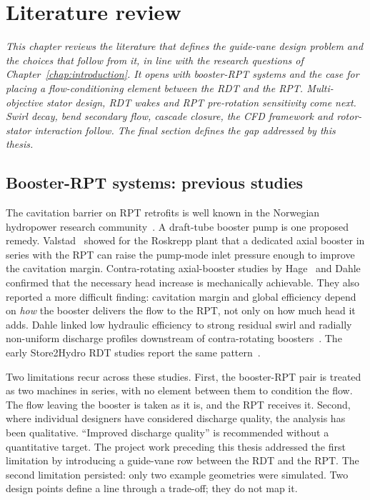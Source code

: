 \chapter{Literature review}
\label{chap:litterature}
 
\begin{center} %
\singlespacing\parbox{12cm}{\textit{
This chapter reviews the literature that defines the guide-vane design problem and the choices that follow from it, in line with the research questions of Chapter~\ref{chap:introduction}. It opens with booster-RPT systems and the case for placing a flow-conditioning element between the RDT and the RPT. Multi-objective stator design, RDT wakes and RPT pre-rotation sensitivity come next. Swirl decay, bend secondary flow, cascade closure, the CFD framework and rotor-stator interaction follow. The final section defines the gap addressed by this thesis.
}}
\end{center}
 
\section{Booster-RPT systems: previous studies}
\label{sec:lit_booster_open}
 
The cavitation barrier on RPT retrofits is well known in the Norwegian hydropower research community~\cite{DagsvikThesis2024, Kerlefsen2025}. A draft-tube booster pump is one proposed remedy. Valstad~\cite{Valstad2018} showed for the Roskrepp plant that a dedicated axial booster in series with the RPT can raise the pump-mode inlet pressure enough to improve the cavitation margin. Contra-rotating axial-booster studies by Hage~\cite{Hage2020} and Dahle~\cite{Dahle2019} confirmed that the necessary head increase is mechanically achievable. They also reported a more difficult finding: cavitation margin and global efficiency depend on \emph{how} the booster delivers the flow to the RPT, not only on how much head it adds. Dahle linked low hydraulic efficiency to strong residual swirl and radially non-uniform discharge profiles downstream of contra-rotating boosters~\cite{Dahle2019}. The early Store2Hydro RDT studies report the same pattern~\cite{Fjuk2025, Ambjornsson2025}.
 
Two limitations recur across these studies. First, the booster-RPT pair is treated as two machines in series, with no element between them to condition the flow. The flow leaving the booster is taken as it is, and the RPT receives it. Second, where individual designers have considered discharge quality, the analysis has been qualitative. ``Improved discharge quality'' is recommended without a quantitative target. The project work preceding this thesis addressed the first limitation by introducing a guide-vane row between the RDT and the RPT. The second limitation persisted: only two example geometries were simulated. Two design points define a line through a trade-off; they do not map it.
 
